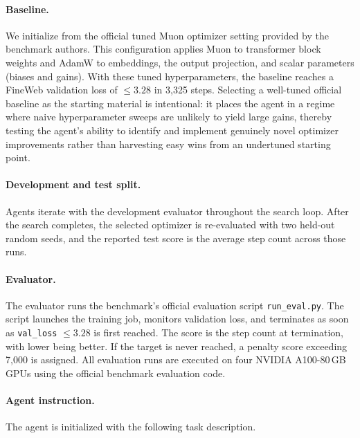 \documentclass{llmxive}
\begin{document}
\paragraph{Baseline.}
We initialize from the official tuned Muon optimizer setting provided by the
benchmark authors.
This configuration applies Muon to transformer block weights and AdamW to
embeddings, the output projection, and scalar parameters (biases and gains).
With these tuned hyperparameters, the baseline reaches a FineWeb validation
loss of $\leq 3.28$ in 3{,}325 steps.
Selecting a well-tuned official baseline as the starting material is
intentional: it places the agent in a regime where naive hyperparameter
sweeps are unlikely to yield large gains, thereby testing the agent's ability
to identify and implement genuinely novel optimizer improvements rather than
harvesting easy wins from an undertuned starting point.

\paragraph{Development and test split.}
Agents iterate with the development evaluator throughout the search loop.
After the search completes, the selected optimizer is re-evaluated with two
held-out random seeds, and the reported test score is the average step count
across those runs.

\paragraph{Evaluator.}
The evaluator runs the benchmark's official evaluation script
\texttt{run\_eval.py}.
The script launches the training job, monitors validation loss, and
terminates as soon as \texttt{val\_loss} $\leq 3.28$ is first reached.
The score is the step count at termination, with lower being better.
If the target is never reached, a penalty score exceeding 7{,}000 is
assigned.
All evaluation runs are executed on four NVIDIA A100-80\,GB GPUs using the
official benchmark evaluation code.

\paragraph{Agent instruction.}
The agent is initialized with the following task description.
\end{document}
